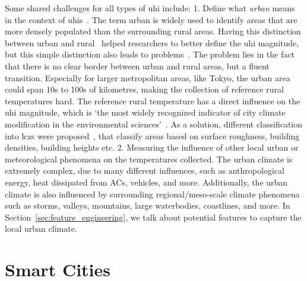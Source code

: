 Some shared challenges for all types of \gls{uhi} include: 1. Define what \textit{urban} means in the context of \gls{uhi}s~\cite{stewart2009newly}. The term urban is widely used to identify areas that are more densely populated than the surrounding rural areas. Having this distinction between urban and rural~\cite{lowry1977empirical} helped researchers to better define the \gls{uhi} magnitude, but this simple distinction also leads to problems~\cite{stewart2011systematic}. The problem lies in the fact that there is no clear border between urban and rural areas, but a fluent transition. Especially for larger metropolitan areas, like Tokyo, the urban area could span 10s to 100s of kilometres, making the collection of reference rural temperatures hard. The reference rural temperature has a direct influence on the \gls{uhi} magnitude, which is `the most widely recognized indicator of city climate modification in the environmental sciences'~\cite{stewart2009newly}. As a solution, different classification into \gls{lcz}s were proposed~\cite{stewart2012local, stewart2009newly}, that classify areas based on surface roughness, building densities, building heights etc. 2. Measuring the influence of other local urban or meteorological phenomena on the temperatures collected. The urban climate is extremely complex, due to many different influences, such as anthropological energy, heat dissipated from ACs, vehicles, and more. Additionally, the urban climate is also influenced by surrounding regional/meso-scale climate phenomena such as storms, valleys, mountains, large waterbodies, coastlines, and more. In Section~\ref{sec:feature_engineering}, we talk about potential features to capture the local urban climate.

\section{Smart Cities}

